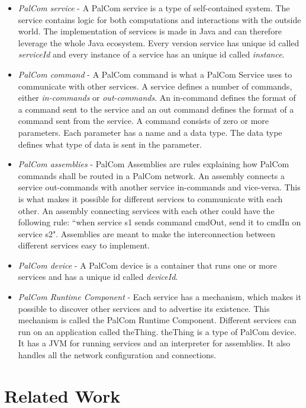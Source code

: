 \documentclass{cslthse-msc}
\begin{document}
\begin{itemize}
\item \emph{PalCom service} - A PalCom service is a type of self-contained system. The service contains logic for both computations and interactions with the outside world. The implementation of services is made in Java and can therefore leverage the whole Java ecosystem. Every version service has unique id called \emph{serviceId} and every instance of a service has an unique id called \emph{instance}. 


\item \emph{PalCom command} - A PalCom command is what a PalCom Service uses to communicate with other services. A service defines a number of commands, either \emph{in-commands} or \emph{out-commands}. An in-command defines the format of a command sent to the service and an out command defines the format of a command sent from the service. A command consists of zero or more parameters. Each parameter has a name and a data type. The data type defines what type of data is sent in the parameter. 

\item \emph{PalCom assemblies} - PalCom Assemblies are rules explaining how PalCom commands shall be routed in a PalCom network. An assembly connects a service out-commands with another service in-commands and vice-versa. This is what makes it possible for different services to communicate with each other. An assembly connecting services with each other could have the following rule:  “when service s1 sends command cmdOut, send it to cmdIn on service s2". Assemblies are meant to make the interconnection between different services easy to implement.

\item \emph{PalCom device} - A PalCom device is a container that runs one or more services and has a unique id called \emph{deviceId}.

\item \emph{PalCom Runtime Component} - Each service has a mechanism, which makes it possible to discover other services and to advertise its existence. This mechanism is called the PalCom Runtime Component. Different services can run on an application called theThing. theThing is a type of PalCom device. It has a JVM for running services and an interpreter for assemblies. It also handles all the network configuration and connections.

\end{itemize}


\chapter[Related Work]{Related Work}
\end{document}
